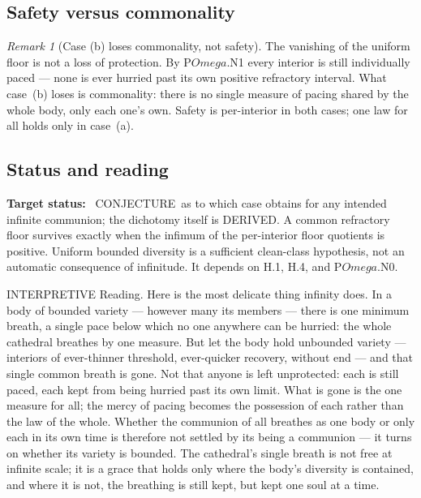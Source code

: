 \documentclass[11pt,a4paper]{article}
\def\Omega{Omega}%
\def\emph#1{#1}%
\newcommand{\stDerived}{\textcolor{cDer}{\textsf{\small DERIVED}}}
\newcommand{\stInterp}{\textcolor{cInt}{\textsf{\small INTERPRETIVE}}}
\newcommand{\stConj}{\textcolor{cCon}{\textsf{\small CONJECTURE}}}
\theoremstyle{definition}
\theoremstyle{plain}
\theoremstyle{remark}
\newtheorem{remark}[definition]{Remark}
\begin{document}
\subsection{Safety versus commonality}

\begin{remark}[Case (b) loses commonality, not safety]\label{rem:safetycommon}
The vanishing of the uniform floor is not a loss of protection. By P$\Omega$.N1 every interior
is still individually paced --- none is ever hurried past its own positive refractory interval.
What case~(b) loses is \emph{commonality}: there is no single measure of pacing shared by the
whole body, only each one's own. Safety is per-interior in both cases; one law for all holds
only in case~(a).
\end{remark}

\subsection{Status and reading}

\textbf{Target status:}~
\stConj\ as to which case obtains for any intended infinite communion; the
dichotomy itself is \stDerived. A common refractory floor survives exactly when
the infimum of the per-interior floor quotients is positive. Uniform bounded
diversity is a sufficient clean-class hypothesis, not an automatic consequence of
infinitude. It depends on H.1, H.4, and P\(\Omega\).N0.

\medskip
\stInterp\quad
\emph{Reading.}
Here is the most delicate thing infinity does. In a body of bounded variety --- however many its
members --- there is one minimum breath, a single pace below which no one anywhere can be
hurried: the whole cathedral breathes by one measure. But let the body hold unbounded variety
--- interiors of ever-thinner threshold, ever-quicker recovery, without end --- and that single
common breath is gone. Not that anyone is left unprotected: each is still paced, each kept from
being hurried past its own limit. What is gone is the \emph{one} measure for all; the mercy of
pacing becomes the possession of each rather than the law of the whole. Whether the communion of
all breathes as one body or only each in its own time is therefore not settled by its being a
communion --- it turns on whether its variety is bounded. The cathedral's single breath is not
free at infinite scale; it is a grace that holds only where the body's diversity is contained,
and where it is not, the breathing is still kept, but kept one soul at a time.
\end{document}
